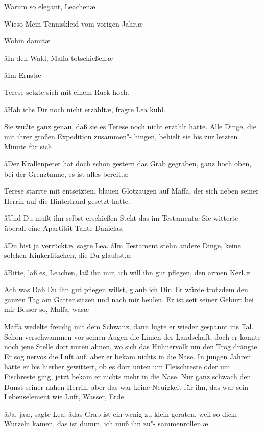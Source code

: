 \aanah{}Warum so elegant, Leachen\frag{}\ae{}

\aanah{}Wieso\frag{} Mein Tenniskleid vom vorigen Jahr.\ae{}

\aanah{}Wohin damit\frag{}\ae{}

\aa{}In den Wald, Maffa totschießen.\ae{}

\aa{}Im Ernst\frag{}\ae{}

Terese setzte sich mit einem Ruck hoch.

\aa{}Hab ichs Dir noch nicht erzählt\frag{}\ae{}, fragte Lea kühl.

Sie wußte ganz genau, daß sie es Terese noch nicht erzählt
hatte. Alle Dinge, die mit ihrer großen Expedition zusammen"-%
hingen, behielt sie bis zur letzten Minute für sich.

\aa{}Der Krallenpeter hat doch schon gestern das Grab gegraben,
ganz hoch oben, bei der Grenztanne, es ist alles bereit.\ae{}

Terese starrte mit entsetzten, blauen Glotzaugen auf Maffa,
der sich neben seiner Herrin auf die Hinterhand gesetzt hatte.

\aa{}Und Du mußt ihn selbst erschießen\frag{} Steht das im Testament\frag{}\ae{}
Sie witterte überall eine Apartität Tante Danielas.

\aa{}Du bist ja verrückt\ae{}, sagte Lea. \aa{}Im Testament stehn andere
Dinge, keine solchen Kinkerlitzchen, die Du glaubst.\ae{}

\aa{}Bitte, laß es, Leachen, laß ihn mir, ich will ihn gut pflegen,
den armen Kerl.\ae{}

\aanah{}Ach was\ausr{} Daß Du ihn gut pflegen willst, glaub ich Dir. Er
würde trotzdem den ganzen Tag am Gatter sitzen und nach
mir heulen. Er ist seit seiner Geburt bei mir\punkte{} Besser so,
Maffa, was\frag{}\ae{}

Maffa wedelte freudig mit dem Schwanz, dann lugte er
wieder gespannt ins Tal. Schon verschwammen vor seinen
Augen die Linien der Landschaft, doch er konnte noch jene
Stelle dort unten ahnen, wo sich das Hühnervolk um den Trog
drängte. Er sog nervös die Luft auf, aber er bekam nichts
in die Nase. In jungen Jahren hätte er bis hierher gewittert,
ob es dort unten um Fleischreste oder um Fischreste ging, jetzt
bekam er nichts mehr in die Nase. Nur ganz schwach den Dunst
seiner nahen Herrin, aber das war keine Neuigkeit für ihn,
das war sein Lebenselement wie Luft, Wasser, Erde.

\aa{}Ja, ja\ae{}, sagte Lea, \aa{}das Grab ist ein wenig zu klein geraten,
weil so dicke Wurzeln kamen, das ist dumm, ich muß ihn zu"-%
sammenrollen.\ae{}%
\eingriff{eS12-1}{zusammenrollen.\ae{} ] zusammenrollen\ae{}.}

